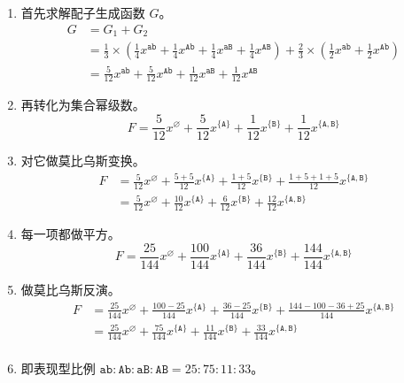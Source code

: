 \documentclass{article}
\begin{document}
\begin{enumerate}
	\item 首先求解配子生成函数 $G$。\\ 
		$$
		\begin{aligned}
			G &= G_1+G_2 \\
			  &= \frac{1}{3} \times (\frac{1}{4}x^{\texttt{ab}}+\frac{1}{4}x^{\texttt{Ab}}+\frac{1}{4}x^{\texttt{aB}}+\frac{1}{4}x^{\texttt{AB}})+\frac{2}{3} \times (\frac{1}{2}x^{\texttt{ab}} + \frac{1}{2}x^{\texttt{Ab}}) \\
			  &= \frac{5}{12} x^{\texttt{ab}} + \frac{5}{12} x^{\texttt{Ab}} + \frac{1}{12} x^{\texttt{aB}} + \frac{1}{12} x^{\texttt{AB}}
		\end{aligned}
		$$
	\item 再转化为集合幂级数。\\
		$$F = \frac{5}{12} x^{\varnothing} + \frac{5}{12} x^{\{\texttt{A}\}} + \frac{1}{12} x^{\{\texttt{B}\}} + \frac{1}{12} x^{\{\texttt{A},\texttt{B}\}}$$
	\item 对它做莫比乌斯变换。\\
		$$
		\begin{aligned}
			F &= \frac{5}{12} x^{\varnothing} + \frac{5+5}{12} x^{\{\texttt{A}\}} + \frac{1+5}{12} x^{\{\texttt{B}\}} + \frac{1+5+1+5}{12} x^{\{\texttt{A},\texttt{B}\}} \\
			  &= \frac{5}{12} x^{\varnothing} + \frac{10}{12} x^{\{\texttt{A}\}} + \frac{6}{12} x^{\{\texttt{B}\}} + \frac{12}{12} x^{\{\texttt{A},\texttt{B}\}}
		\end{aligned}
		$$
	\item 每一项都做平方。\\
		$$F=\frac{25}{144} x^{\varnothing} + \frac{100}{144} x^{\{\texttt{A}\}} + \frac{36}{144} x^{\{\texttt{B}\}} + \frac{144}{144} x^{\{\texttt{A},\texttt{B}\}}$$
	\item 做莫比乌斯反演。\\
		$$
		\begin{aligned}
			F &= \frac{25}{144} x^{\varnothing} + \frac{100-25}{144} x^{\{\texttt{A}\}} + \frac{36-25}{144} x^{\{\texttt{B}\}} + \frac{144-100-36+25}{144} x^{\{\texttt{A},\texttt{B}\}} \\
			  &= \frac{25}{144} x^{\varnothing} + \frac{75}{144} x^{\{\texttt{A}\}} + \frac{11}{144} x^{\{\texttt{B}\}} + \frac{33}{144} x^{\{\texttt{A},\texttt{B}\}} \\
		\end{aligned}
		$$
	\item 即表现型比例 $\texttt{ab} : \texttt{Ab} : \texttt{aB} : \texttt{AB}=25:75:11:33$。

\end{enumerate}
\end{document}
